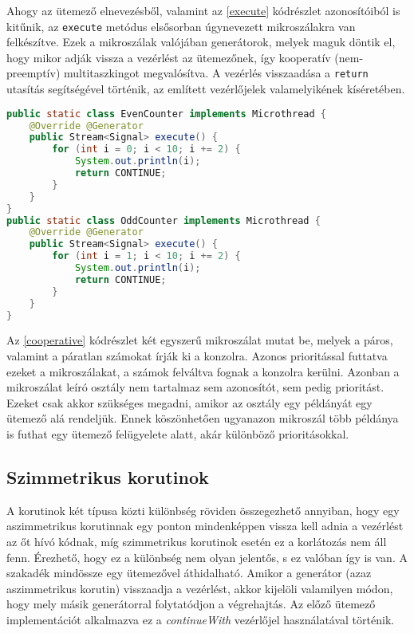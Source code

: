 Ahogy az ütemező elnevezésből, valamint az \ref{execute} kódrészlet azonosítóiból is kitűnik, az \texttt{execute} metódus elsősorban úgynevezett mikroszálakra van felkészítve. Ezek a mikroszálak valójában generátorok, melyek maguk döntik el, hogy mikor adják vissza a vezérlést az ütemezőnek, így kooperatív (nem-preemptív) multitaszkingot megvalósítva. A vezérlés visszaadása a \texttt{return} utasítás segítségével történik, az említett vezérlőjelek valamelyikének kíséretében.

\begin{lstlisting}[language=Java, caption={Kooperatív mikroszálak}, escapechar=!, captionpos=b, aboveskip=1em, label=cooperative]
public static class EvenCounter implements Microthread {
    @Override @Generator
    public Stream<Signal> execute() {
        for (int i = 0; i < 10; i += 2) {
            System.out.println(i);
            return CONTINUE;
        }
    }
}
public static class OddCounter implements Microthread {
    @Override @Generator
    public Stream<Signal> execute() {
        for (int i = 1; i < 10; i += 2) {
            System.out.println(i);
            return CONTINUE;
        }
    }
}
\end{lstlisting} 

Az \ref{cooperative} kódrészlet két egyszerű mikroszálat mutat be, melyek a páros, valamint a páratlan számokat írják ki a konzolra. Azonos prioritással futtatva ezeket a mikroszálakat, a számok felváltva fognak a konzolra kerülni. Azonban a mikroszálat leíró osztály nem tartalmaz sem azonosítót, sem pedig prioritást. Ezeket csak akkor szükséges megadni, amikor az osztály egy példányát egy ütemező alá rendeljük. Ennek köszönhetően ugyanazon mikroszál több példánya is futhat egy ütemező felügyelete alatt, akár különböző prioritásokkal.

\subsection{Szimmetrikus korutinok}

A korutinok két típusa közti különbség röviden összegezhető annyiban, hogy egy aszimmetrikus korutinnak egy ponton mindenképpen vissza kell adnia a vezérlést az őt hívó kódnak, míg szimmetrikus korutinok esetén ez a korlátozás nem áll fenn. Érezhető, hogy ez a különbség nem olyan jelentős, s ez valóban így is van. A szakadék mindössze egy ütemezővel áthidalható.  Amikor a generátor (azaz aszimmetrikus korutin) visszaadja a vezérlést, akkor kijelöli valamilyen módon, hogy mely másik generátorral folytatódjon a végrehajtás. Az előző ütemező implementációt alkalmazva ez a \textit{continueWith} vezérlőjel használatával történik.

